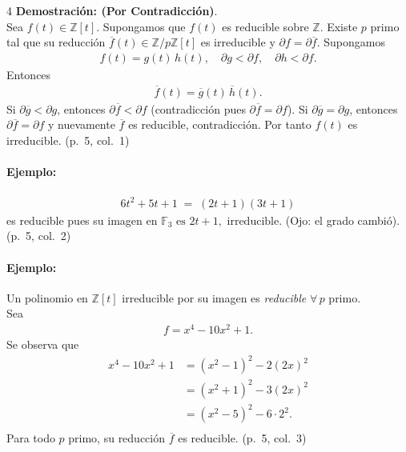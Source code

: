 \documentclass[landscape,a4paper]{article}
\begin{document}
\begin{multicols}{4}
\noindent \textbf{Demostración: (Por Contradicción)}.\\
Sea $f(t)\in\mathbb{Z}[t]$. Supongamos que $f(t)$ es reducible sobre $\mathbb{Z}$. Existe $p$ primo tal que su reducción $\overline{f}(t)\in\mathbb{Z}/p\mathbb{Z}[t]$ es irreducible y $\partial f = \partial \overline{f}$. Supongamos 
\begin{align*}
f(t) = g(t)\,h(t), 
\quad 
\partial g < \partial f, 
\quad
\partial h < \partial f.
\end{align*}
Entonces 
\begin{align*}
\overline{f}(t) = \overline{g}(t)\,\overline{h}(t).
\end{align*}
Si $\partial\overline{g} < \partial g$, entonces $\partial \overline{f} < \partial f$ (contradicción pues $\partial \overline{f} = \partial f$).  
Si $\partial\overline{g} = \partial g$, entonces $\partial \overline{f} = \partial f$ y nuevamente $\overline{f}$ es reducible, contradicción.  
Por tanto $f(t)$ es irreducible. (p.~5, col.~1)

\noindent \paragraph{Ejemplo:} 
\begin{align*}
6t^2 + 5t + 1 \;=\; (2t+1)(3t+1) 
\end{align*}
es reducible pues su imagen en  $\mathbb{F}_3 \text{ es }2t+1,\text{ irreducible.}$
(Ojo: el grado cambió). (p.~5, col.~2)

\noindent \paragraph{Ejemplo:} Un polinomio en $\mathbb{Z}[t]$ irreducible por su imagen es \emph{reducible} $\forall\,p$ primo.\\
Sea 
\begin{align*}
f = x^4 - 10x^2 + 1. 
\end{align*}
Se observa que 
\begin{align*}
x^4 - 10x^2 + 1 &= (x^2 - 1)^2 - 2(2x)^2 \\
&= (x^2 + 1)^2 - 3(2x)^2 \\
&= (x^2 - 5)^2 - 6\cdot 2^2.\\
\end{align*}
Para todo $p$ primo, su reducción $\overline{f}$ es reducible. (p.~5, col.~3)
\end{multicols}
\end{document}
